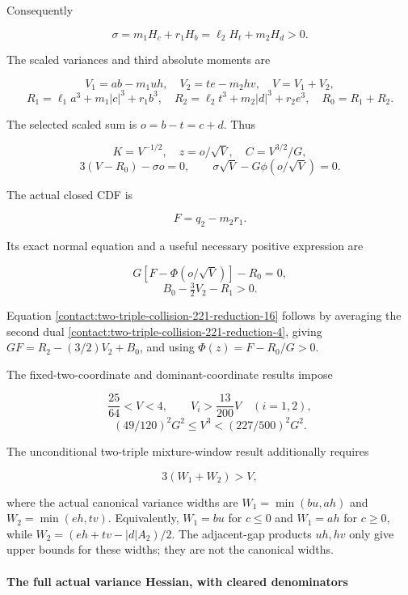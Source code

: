 Consequently

\[
 \sigma=m_1H_c+r_1H_b=\ell_2H_t+m_2H_d>0.
\tag{B.31.12}\label{contact:two-triple-collision-221-reduction-12}
\]

The scaled variances and third absolute moments are

\[
 V_1=ab-m_1uh,\quad V_2=te-m_2hv,\quad V=V_1+V_2,
\]
\[
 R_1=\ell_1a^3+m_1|c|^3+r_1b^3,
 \quad R_2=\ell_2t^3+m_2|d|^3+r_2e^3,
 \quad R_0=R_1+R_2.
\tag{B.31.13}\label{contact:two-triple-collision-221-reduction-13}
\]

The selected scaled sum is $o=b-t=c+d$. Thus

\[
 K=V^{-1/2},\quad z=o/\sqrt V,\quad C=V^{3/2}/G,
\]
\[
 \boxed{3(V-R_0)-\sigma o=0,\qquad
 \sigma\sqrt V-G\phi(o/\sqrt V)=0.}
\tag{B.31.14}\label{contact:two-triple-collision-221-reduction-14}
\]

The actual closed CDF is

\[
 F=q_2-m_2r_1.
\]

Its exact normal equation and a useful necessary positive expression are

\[
 \boxed{G[F-\Phi(o/\sqrt V)]-R_0=0,}
\tag{B.31.15}\label{contact:two-triple-collision-221-reduction-15}
\]
\[
 \boxed{B_0-\tfrac32V_2-R_1>0.}
\tag{B.31.16}\label{contact:two-triple-collision-221-reduction-16}
\]

Equation \eqref{contact:two-triple-collision-221-reduction-16} follows by averaging the second dual \eqref{contact:two-triple-collision-221-reduction-4}, giving
$GF=R_2-(3/2)V_2+B_0$, and using $\Phi(z)=F-R_0/G>0$.

The fixed-two-coordinate and dominant-coordinate results impose

\[
 \frac{25}{64}<V<4,\qquad V_i>\frac{13}{200}V\quad(i=1,2),
\]
\[
 (49/120)^2G^2\le V^3<(227/500)^2G^2.
\tag{B.31.17}\label{contact:two-triple-collision-221-reduction-17}
\]

The unconditional two-triple mixture-window result additionally requires

\[
 3(W_1+W_2)>V,
\tag{B.31.18}\label{contact:two-triple-collision-221-reduction-18}
\]

where the actual canonical variance widths are
$W_1=\min(bu,ah)$ and $W_2=\min(eh,tv)$. Equivalently,
$W_1=bu$ for $c\le 0$ and $W_1=ah$ for $c\ge 0$, while
$W_2=(eh+tv-|d|A_2)/2$. The adjacent-gap products $uh,hv$ only
give upper bounds for these widths; they are not the canonical widths.

\paragraph{The full actual variance Hessian, with cleared denominators}

